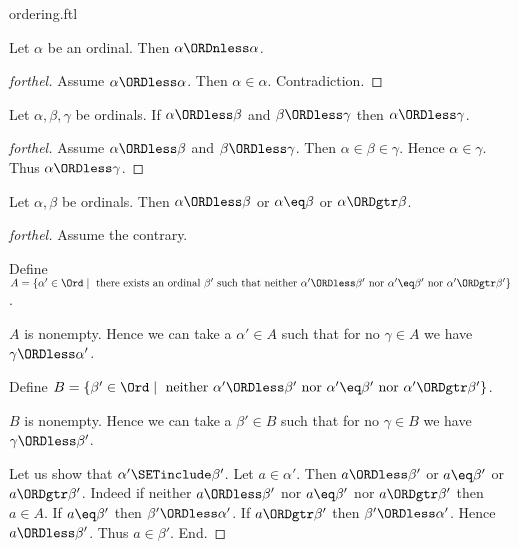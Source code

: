 \documentclass{naproche-library}
\begin{document}
\begin{smodule}[title=The Standard Ordering of the Ordinals]{ordering.ftl}
\begin{proposition}[forthel,id=SET_THEORY_02_6229364135952384]
  Let $\alpha$ be an ordinal.
  Then $\alpha \ORDnless \alpha$.
\end{proposition}
\begin{proof}[forthel]
  Assume $\alpha \ORDless \alpha$.
  Then $\alpha \in \alpha$.
  Contradiction.
\end{proof}

\begin{proposition}[forthel,id=SET_THEORY_02_7098683017396224]
  Let $\alpha, \beta, \gamma$ be ordinals.
  If $\alpha \ORDless \beta$ and $\beta \ORDless \gamma$ then $\alpha \ORDless \gamma$.
\end{proposition}
\begin{proof}[forthel]
  Assume $\alpha \ORDless \beta$ and $\beta \ORDless \gamma$.
  Then $\alpha \in \beta \in \gamma$.
  Hence $\alpha \in \gamma$.
  Thus $\alpha \ORDless \gamma$.
\end{proof}

\begin{proposition}[forthel,id=SET_THEORY_02_1718825707896832]
  Let $\alpha, \beta$ be ordinals.
  Then $\alpha \ORDless \beta$ or $\alpha \eq \beta$ or $\alpha \ORDgtr \beta$.
\end{proposition}
\begin{proof}[forthel]
  Assume the contrary.
  
  Define $A = \{ \alpha' \in \Ord \mid\text{ there exists an ordinal }\beta'\text{ such that neither }\alpha' \ORDless \beta'\text{ nor }\alpha' \eq \beta'\text{ nor }\alpha' \ORDgtr \beta' \}$.
  
  $A$ is nonempty.
  Hence we can take a $\alpha' \in A$ such that for no $\gamma \in A$ we have $\gamma \ORDless \alpha'$.
  
  Define $B = \{ \beta' \in \Ord \mid\text{ neither }\alpha' \ORDless \beta'\text{ nor }\alpha' \eq \beta'\text{ nor }\alpha' \ORDgtr \beta' \}$.
  
  $B$ is nonempty.
  Hence we can take a $\beta' \in B$ such that for no $\gamma \in B$ we have $\gamma \ORDless \beta'$.

  Let us show that $\alpha' \SETinclude \beta'$.
    Let $a \in \alpha'$.
    Then $a \ORDless \beta'$ or $a \eq \beta'$ or $a \ORDgtr \beta'$.
    Indeed if neither $a \ORDless \beta'$ nor $a \eq \beta'$ nor $a \ORDgtr \beta'$ then
    $a \in A$.
    If $a \eq \beta'$ then $\beta' \ORDless \alpha'$.
    If $a \ORDgtr \beta'$ then $\beta' \ORDless \alpha'$.
    Hence $a \ORDless \beta'$.
    Thus $a \in \beta'$.
  End.


\end{proof}
\end{smodule}
\end{document}

